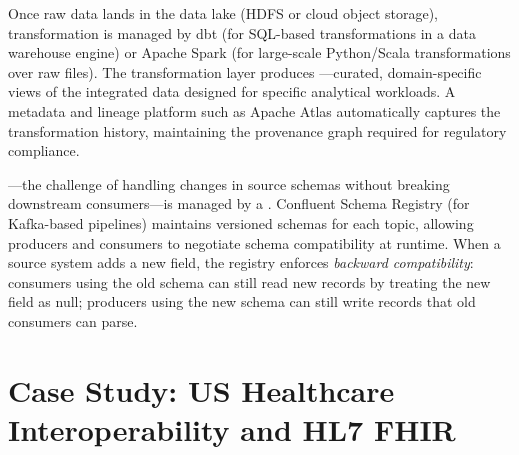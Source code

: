 Once raw data lands in the data lake (HDFS or cloud object storage),
transformation is managed by dbt (for SQL-based transformations in a
data warehouse engine) or Apache Spark (for large-scale Python/Scala
transformations over raw files). The transformation layer produces
---curated, domain-specific views of the integrated
data designed for specific analytical workloads. A metadata and lineage
platform such as Apache Atlas automatically captures the transformation
history, maintaining the provenance graph required for regulatory
compliance.

---the challenge of handling changes in source
schemas without breaking downstream consumers---is managed by a
. Confluent Schema Registry (for Kafka-based
pipelines) maintains versioned schemas for each topic, allowing
producers and consumers to negotiate schema compatibility at runtime.
When a source system adds a new field, the registry enforces
\emph{backward compatibility}: consumers using the old schema can still
read new records by treating the new field as null; producers using the
new schema can still write records that old consumers can parse.

\section{Case Study: US Healthcare Interoperability and HL7 FHIR}
\label{sec:healthcare-case}

